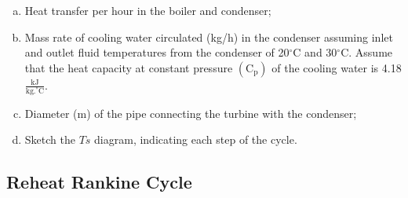 \documentclass[10pt,compress,handout,ignorenonframetext]{beamer}
\begin{document}
\begin{frame}
\begin{enumerate}[(a)]
         \item Heat transfer per hour in the boiler and condenser;
         \item Mass rate of cooling water circulated (kg/h) in the condenser assuming inlet and outlet fluid temperatures from the condenser of 20$^{\circ}$C and 30$^{\circ}$C. Assume that the heat capacity at constant pressure $\left(\text{C}_{\text{p}}\right)$ of the cooling water is 4.18 $\frac{\text{kJ}}{\text{kg.}^{\circ}\text{C}}$.
         \item Diameter (m) of the pipe connecting the turbine with the condenser;
         \item Sketch the $Ts$ diagram, indicating each step of the cycle.
    \end{enumerate}
 \normalsize
\end{frame}


\subsection{Reheat Rankine Cycle}
\end{document}
